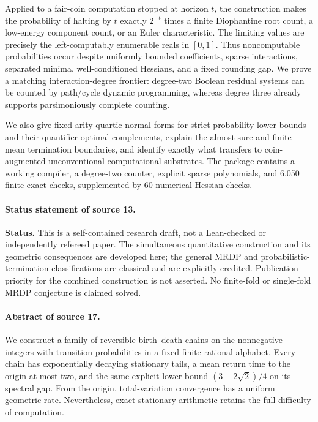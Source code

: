\documentclass[11pt,letterpaper]{article}
\numberwithin{equation}{section}
\theoremstyle{definition}
\theoremstyle{remark}
\begin{document}
Applied to a fair-coin computation stopped at horizon $t$, the construction
makes the probability of halting by $t$ exactly $2^{-t}$ times a finite
Diophantine root count, a low-energy component count, or an Euler
characteristic. The limiting values are precisely the left-computably
enumerable reals in $[0,1]$. Thus noncomputable probabilities occur despite
uniformly bounded coefficients, sparse interactions, separated minima,
well-conditioned Hessians, and a fixed rounding gap. We prove a matching
interaction-degree frontier: degree-two Boolean residual systems can be
counted by path/cycle dynamic programming, whereas degree three already
supports parsimoniously complete counting.

We also give fixed-arity quartic normal forms for strict probability lower
bounds and their quantifier-optimal complements, explain the almost-sure and
finite-mean termination boundaries, and identify exactly what transfers to
coin-augmented unconventional computational substrates. The package contains
a working compiler, a degree-two counter, explicit sparse polynomials, and
6,050 finite exact checks, supplemented by 60 numerical Hessian checks.
\paragraph{Status statement of source 13.}
\small\textbf{Status.} This is a self-contained research draft, not a Lean-checked
or independently refereed paper. The simultaneous quantitative construction
and its geometric consequences are developed here; the general MRDP and
probabilistic-termination classifications are classical and are explicitly
credited. Publication priority for the combined construction is not asserted.
No finite-fold or single-fold MRDP conjecture is claimed solved.
\paragraph{Abstract of source 17.}
We construct a family of reversible birth--death chains on the nonnegative
integers with transition probabilities in a fixed finite rational alphabet.
Every chain has exponentially decaying stationary tails, a mean return time
to the origin at most two, and the same explicit lower bound
$(3-2\sqrt2)/4$ on its spectral gap. From the origin, total-variation
convergence has a uniform geometric rate. Nevertheless, exact stationary
arithmetic retains the full difficulty of computation.
\end{document}
